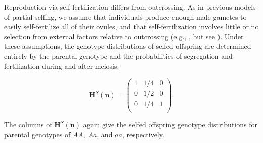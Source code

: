 \documentclass[11pt]{article}
\def\mbf#1{\mathbf{#1}}
\begin{document}
Reproduction via self-fertilization differs from outcrossing. As in previous models of partial selfing, we assume that individuals produce enough male gametes to easily self-fertilize all of their ovules, and that self-fertilization involves little or no selection from external factors relative to outcrossing (e.g., \citealt{Charlesworth1978a,JordanConnallon2014,Olito2017}, but see \citealt{Tazzyman2015}). Under these assumptions, the genotype distributions of selfed offspring are determined entirely by the parental genotype and the probabilities of segregation and fertilization during and after meiosis: 
\begin{linenomath*}
\begin{equation} \label{eq:HS}
	\mbf{H}^S(\tilde{\mbf{n}}) = 
			\left(
			\begin{array}{ccc}
				1 & 1/4 & 0 \\
				0 & 1/2 & 0 \\
				0 & 1/4 & 1 \\
			\end{array} \right).
\end{equation}
\end{linenomath*}
\noindent The columns of $\mbf{H}^S(\tilde{\mbf{n}})$ again give the selfed offspring genotype distributions for parental genotypes of $AA$, $Aa$, and $aa$, respectively.


\end{document}
